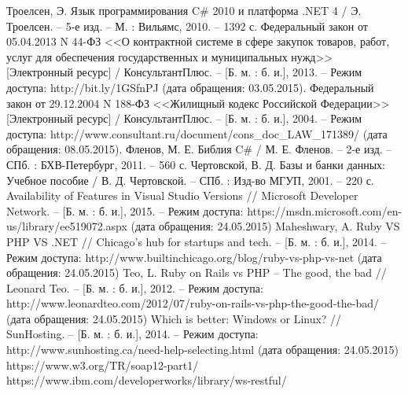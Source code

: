 \begin{thebibliography}{99}
	 Троелсен, Э. Язык программирования C\# 2010 и платформа .NET 4 / Э. Троелсен. – 5-е изд. – М. : Вильямс, 2010. – 1392 с.
	 Федеральный закон от 05.04.2013 N 44-ФЗ <<О контрактной системе в сфере закупок товаров, работ, услуг для обеспечения государственных и муниципальных нужд>> [Электронный ресурс] / КонсультантПлюс. – [Б. м. : б. и.], 2013. – Режим доступа: http://bit.ly/1GSfnPJ (дата обращения: 03.05.2015).
	 Федеральный закон от 29.12.2004 N 188-ФЗ <<Жилищный кодекс Российской Федерации>> [Электронный ресурс] / КонсультантПлюс. – [Б. м. : б. и.], 2004. – Режим доступа: http://www.consultant.ru/document/cons\_doc\_LAW\_171389/ (дата обращения: 08.05.2015).
	 Фленов, М. Е. Библия C\# / М. Е. Фленов. – 2-е изд. – СПб. : БХВ-Петербург, 2011. – 560 с.
	 Чертовской, В. Д. Базы и банки данных: Учебное пособие / В. Д. Чертовской. – СПб. : Изд-во МГУП, 2001. –  220 с.
	 Availability of Features in Visual Studio Versions // Microsoft Developer Network. – [Б. м. : б. и.], 2015. – Режим доступа: https://msdn.microsoft.com/en-us/library/ee519072.aspx (дата обращения: 24.05.2015)
	 Maheshwary, A. Ruby VS PHP VS .NET // Chicago's hub for startups and tech. – [Б. м. : б. и.], 2014. – Режим доступа: http://www.builtinchicago.org/blog/ruby-vs-php-vs-net (дата обращения: 24.05.2015)
	 Teo, L. Ruby on Rails vs PHP – The good, the bad // Leonard Teo. – [Б. м. : б. и.], 2012. – Режим доступа: http://www.leonardteo.com/2012/07/ruby-on-rails-vs-php-the-good-the-bad/ (дата обращения: 24.05.2015)
	 Which is better: Windows or Linux? // SunHosting. – [Б. м. : б. и.], 2014. – Режим доступа: http://www.sunhosting.ca/need-help-selecting.html (дата обращения: 24.05.2015)
	 https://www.w3.org/TR/soap12-part1/
	 https://www.ibm.com/developerworks/library/ws-restful/
\end{thebibliography}


\clearpage
\newpage